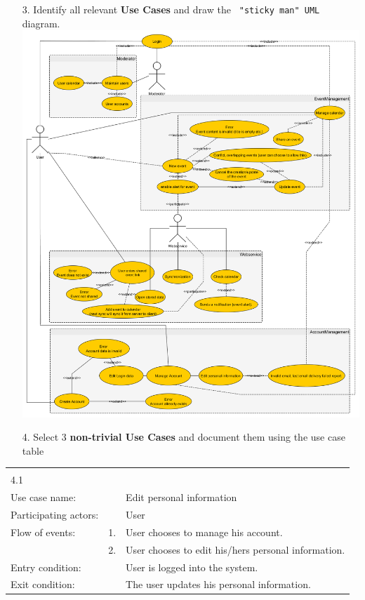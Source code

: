\documentclass{article}
\begin{document}
	\begin{enumerate}
		\item[3.] Identify all  relevant \textbf{Use Cases} and draw the \verb= "sticky man" UML= diagram.\\
		\includegraphics[scale = 0.38]{UserCases.png}\\
		\pagebreak{}
		\item[4.] Select 3 \textbf{non-trivial Use Cases} and document them using the use case table\\
	\end{enumerate}
\begin{tabular}{l r @{} l}
	\multicolumn{2}{c}{} \\
	4.1&&\\
	\hline
	Use case name:	&&Edit personal information\\
	\hline
	Participating actors:&&User \\
	\hline
	Flow of events:	&1.&User chooses to manage his account.\\
				&2.&User chooses to edit his/hers personal information.\\
	\hline
	Entry condition:	&&User is logged into the system.\\
	\hline
	Exit condition:	&&The user updates his personal information.\\
	\hline
\end{tabular}
\end{document}
